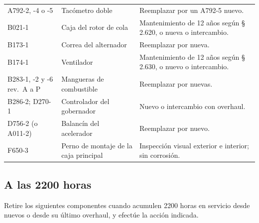 {\begin{longtable}{@{}p{2.1cm}p{2.6cm}p{\dimexpr\linewidth-4.7cm-4\tabcolsep}@{}}
A792-2, -4 o -5 & Tacómetro doble & Reemplazar por un A792-5 nuevo. \\
B021-1 & Caja del rotor de cola & Mantenimiento de 12 años según \S\,2.620, o nueva o intercambio. \\
B173-1 & Correa del alternador & Reemplazar por nueva. \\
B174-1 & Ventilador & Mantenimiento de 12 años según \S\,2.630, o nuevo o intercambio. \\
B283-1, -2 y -6 rev.~A a P & Mangueras de combustible & Reemplazar por nuevas. \\
B286-2; D270-1 & Controlador del gobernador & Nuevo o intercambio con overhaul. \\
D756-2 (o A011-2) & Balancín del acelerador & Reemplazar por nuevo. \\
F650-3 & Perno de montaje de la caja principal & Inspección visual exterior e interior; sin corrosión. \\
\bottomrule
\end{longtable}}

\subsection{A las 2200 horas}

Retire los siguientes componentes cuando acumulen 2200 horas en servicio desde nuevos o desde su último overhaul, y efectúe la acción indicada.

